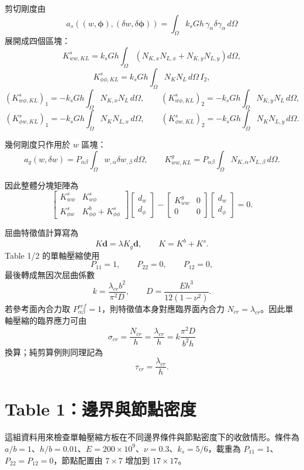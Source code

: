 \documentclass[12pt,a4paper]{article}
\begin{document}
剪切剛度由
\[
a_s((w,\boldsymbol\phi),(\delta w,\delta\boldsymbol\phi))
=\int_\Omega k_sGh\,\gamma_\alpha\delta\gamma_\alpha\,d\Omega
\]
展開成四個區塊：
\[
K_{ww,KL}^s
=k_sGh\int_{\Omega}
\left(N_{K,x}N_{L,x}+N_{K,y}N_{L,y}\right)d\Omega,
\]
\[
K_{\phi\phi,KL}^s
=k_sGh\int_{\Omega}N_KN_L\,d\Omega\,I_2,
\]
\[
\left(K_{w\phi,KL}^s\right)_1
=-k_sGh\int_{\Omega}N_{K,x}N_L\,d\Omega,
\qquad
\left(K_{w\phi,KL}^s\right)_2
=-k_sGh\int_{\Omega}N_{K,y}N_L\,d\Omega,
\]
\[
\left(K_{\phi w,KL}^s\right)_1
=-k_sGh\int_{\Omega}N_KN_{L,x}\,d\Omega,
\qquad
\left(K_{\phi w,KL}^s\right)_2
=-k_sGh\int_{\Omega}N_KN_{L,y}\,d\Omega .
\]

幾何剛度只作用於 \(w\) 區塊：
\[
a_g(w,\delta w)
=P_{\alpha\beta}\int_{\Omega}
w_{,\alpha}\delta w_{,\beta}\,d\Omega,
\qquad
K_{ww,KL}^g
=P_{\alpha\beta}\int_{\Omega}
N_{K,\alpha}N_{L,\beta}\,d\Omega .
\]

因此整體分塊矩陣為
\[
\begin{bmatrix}
K_{ww}^{s} & K_{w\phi}^{s} \\
K_{\phi w}^{s} & K_{\phi\phi}^{b}+K_{\phi\phi}^{s}
\end{bmatrix}
\begin{bmatrix}
d_w\\ d_{\phi}
\end{bmatrix}
-
\begin{bmatrix}
K_{ww}^{g} & 0\\
0 & 0
\end{bmatrix}
\begin{bmatrix}
d_w\\ d_{\phi}
\end{bmatrix}
=0 .
\]

屈曲特徵值計算寫為
\[
K\boldsymbol d=\lambda K_g\boldsymbol d,
\qquad
K=K^b+K^s .
\]
Table 1/2 的單軸壓縮使用
\[
P_{11}=1,\qquad P_{22}=0,\qquad P_{12}=0,
\]
最後轉成無因次屈曲係數
\[
k=\frac{\lambda_{cr}b^2}{\pi^2D},
\qquad
D=\frac{Eh^3}{12(1-\nu^2)}.
\]
若參考面內合力取 \(P_{\alpha\beta}^{ref}=1\)，則特徵值本身對應臨界面內合力 \(N_{cr}=\lambda_{cr}\)。因此單軸壓縮的臨界應力可由
\[
\sigma_{cr}=\frac{N_{cr}}{h}
=\frac{\lambda_{cr}}{h}
=k\frac{\pi^2D}{b^2h}
\]
換算；純剪算例則同理記為
\[
\tau_{cr}=\frac{\lambda_{cr}}{h}.
\]

\section{Table 1：邊界與節點密度}

這組資料用來檢查單軸壓縮方板在不同邊界條件與節點密度下的收斂情形。條件為 \(a/b=1\)、\(h/b=0.01\)、\(E=200\times10^9\)、\(\nu=0.3\)、\(k_s=5/6\)，載重為 \(P_{11}=1\)、\(P_{22}=P_{12}=0\)，節點配置由 \(7\times7\) 增加到 \(17\times17\)。
\end{document}
